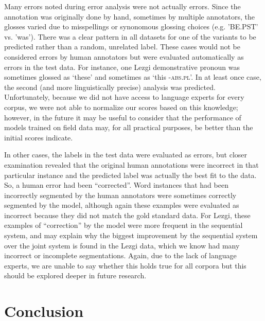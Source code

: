 Many errors noted during error analysis were not actually errors. Since the annotation was originally done by hand, sometimes by multiple annotators, the glosses varied due to misspellings or synonomous glossing choices (e.g. 'BE.PST' vs. 'was'). There was a clear pattern in all datasets for one of the variants to be predicted rather than a random, unrelated label. These cases would not be considered errors by human annotators but were evaluated automatically as errors in the test data. For instance, one Lezgi demonstrative pronoun was sometimes glossed as `these' and sometimes as `this \textsc{-abs.pl}'. In at least once case, the second (and more linguistically precise) analysis was predicted. Unfortunately, because we did not have access to language experts for every corpus, we were not able to normalize our scores based on this knowledge; however, in the future it may be useful to consider that the performance of models trained on field data may, for all practical purposes, be better than the initial scores indicate.

In other cases, the labels in the test data were evaluated as errors, but closer examination revealed that the original human annotations were incorrect in that particular instance and the predicted label was actually the best fit to the data. So, a human error had been ``corrected''. 
Word instances that had been incorrectly segmented by the human annotators were sometimes correctly segmented by the model, although again these examples were evaluated as incorrect because they did not match the gold standard data. For Lezgi, these examples of ``correction'' by the model were more frequent in the sequential system, and may explain why the biggest improvement by the sequential system over the joint system is found in the Lezgi data, which we know had many incorrect or incomplete segmentations.  Again, due to the lack of language experts, we are unable to say whether this holds true for all corpora but this should be explored deeper in future research.


\section{Conclusion}
\label{sec:sgconclusion}


